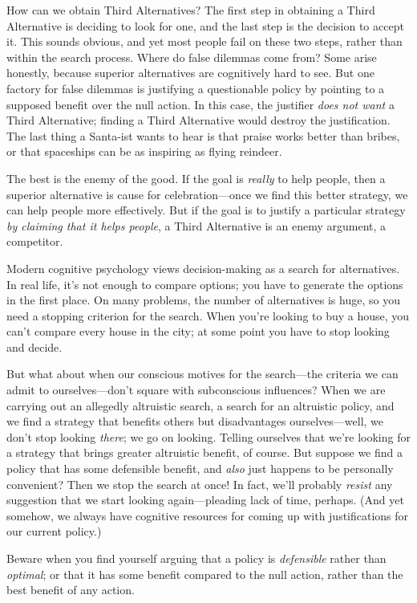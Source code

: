 {
 How can we obtain Third Alternatives? The first step in obtaining
a Third Alternative is deciding to look for one, and the last step is
the decision to accept it. This sounds obvious, and yet most people
fail on these two steps, rather than within the search process. Where
do false dilemmas come from? Some arise honestly, because superior
alternatives are cognitively hard to see. But one factory for false
dilemmas is justifying a questionable policy by pointing to a supposed
benefit over the null action. In this case, the justifier \textit{does
not want} a Third Alternative; finding a Third Alternative would
destroy the justification. The last thing a Santa-ist wants to hear is
that praise works better than bribes, or that spaceships can be as
inspiring as flying reindeer.}

{
 The best is the enemy of the good. If the goal is \textit{really}
to help people, then a superior alternative is cause for
celebration---once we find this better strategy, we can help people
more effectively. But if the goal is to justify a particular strategy
\textit{by claiming that it helps people}, a Third Alternative is an
enemy argument, a competitor.}

{
 Modern cognitive psychology views decision-making as a search for
alternatives. In real life, it's not enough to compare
options; you have to generate the options in the first place. On many
problems, the number of alternatives is huge, so you need a stopping
criterion for the search. When you're looking to buy a
house, you can't compare every house in the city; at
some point you have to stop looking and decide.}

{
 But what about when our conscious motives for the search---the
criteria we can admit to ourselves---don't square with
subconscious influences? When we are carrying out an allegedly
altruistic search, a search for an altruistic policy, and we find a
strategy that benefits others but disadvantages ourselves---well, we
don't stop looking \textit{there}; we go on looking.
Telling ourselves that we're looking for a strategy
that brings greater altruistic benefit, of course. But suppose we find
a policy that has some defensible benefit, and \textit{also} just
happens to be personally convenient? Then we stop the search at once!
In fact, we'll probably \textit{resist} any suggestion
that we start looking again---pleading lack of time, perhaps. (And yet
somehow, we always have cognitive resources for coming up with
justifications for our current policy.)}

{
 Beware when you find yourself arguing that a policy is
\textit{defensible} rather than \textit{optimal}; or that it has some
benefit compared to the null action, rather than the best benefit of
any action.}

